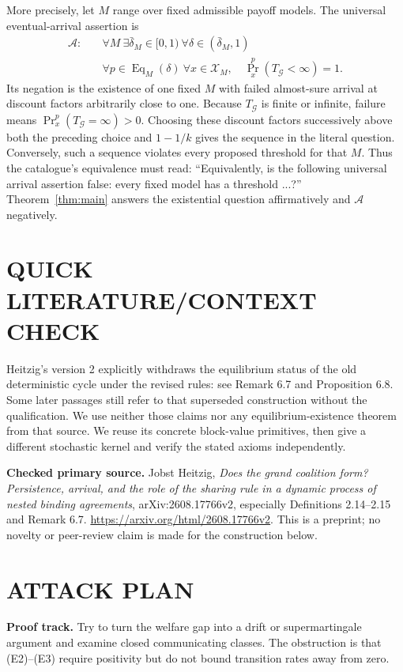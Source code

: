 \documentclass[11pt,a4paper]{article}
\theoremstyle{definition}\newtheorem{definition}[theorem]{Definition}
\theoremstyle{remark}\newtheorem{remark}[theorem]{Remark}
\newcommand{\1}{\mathbf 1}
\begin{document}
More precisely, let $M$ range over fixed admissible payoff models. The
universal eventual-arrival assertion is
\[
 \begin{aligned}
 \mathcal A:\quad &\forall M\ \exists\bar\delta_M\in[0,1)\
                   \forall\delta\in(\bar\delta_M,1)\\
                  &\forall p\in\operatorname{Eq}_M(\delta)\
                   \forall x\in\mathcal X_M,\quad
                   \Pr_x^p(T_{\mathcal G}<\infty)=1.
 \end{aligned}
\]
Its negation is the existence of one fixed $M$ with failed almost-sure
arrival at discount factors arbitrarily close to one. Because
$T_{\mathcal G}$ is finite or infinite, failure means
$\Pr_x^p(T_{\mathcal G}=\infty)>0$. Choosing these discount factors
successively above both the preceding choice and $1-1/k$ gives the
sequence in the literal question. Conversely, such a sequence violates
every proposed threshold for that $M$. Thus the catalogue's equivalence
must read: ``Equivalently, is the following universal arrival assertion
false: every fixed model has a threshold ...?'' Theorem~\ref{thm:main}
answers the existential question affirmatively and $\mathcal A$ negatively.

\section{QUICK LITERATURE/CONTEXT CHECK}
Heitzig's version 2 explicitly withdraws the equilibrium status of the old deterministic cycle under the revised rules: see Remark 6.7 and Proposition 6.8. Some later passages still refer to that superseded construction without the qualification. We use neither those claims nor any equilibrium-existence theorem from that source. We reuse its concrete block-value primitives, then give a different stochastic kernel and verify the stated axioms independently.

\textbf{Checked primary source.} Jobst Heitzig, \emph{Does the grand coalition form? Persistence, arrival, and the role of the sharing rule in a dynamic process of nested binding agreements}, arXiv:2608.17766v2, especially Definitions 2.14--2.15 and Remark 6.7. \url{https://arxiv.org/html/2608.17766v2}. This is a preprint; no novelty or peer-review claim is made for the construction below.

\section{ATTACK PLAN}
\textbf{Proof track.} Try to turn the welfare gap into a drift or supermartingale argument and examine closed communicating classes. The obstruction is that (E2)--(E3) require positivity but do not bound transition rates away from zero.
\end{document}

